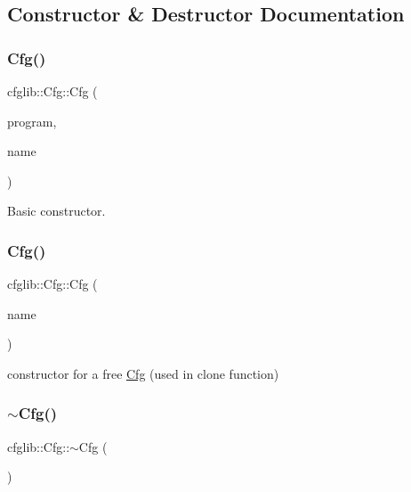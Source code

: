 \subsection{Constructor \& Destructor Documentation}
\mbox{\label{classcfglib_1_1Cfg_a0100bef586e13e2ad53c83b20e365c5e}} 
\subsubsection{\texorpdfstring{Cfg()}{Cfg()}\hspace{0.1cm}{\footnotesize\ttfamily [1/2]}}
{\footnotesize\ttfamily cfglib\+::\+Cfg\+::\+Cfg (\begin{DoxyParamCaption}\item[{\hyperlink{classcfglib_1_1Program}{Program} $\ast$}]{program,  }\item[{List\+Of\+String}]{name }\end{DoxyParamCaption})}

Basic constructor. \mbox{\label{classcfglib_1_1Cfg_a3c7102871bcac1c06389aa38674c76b1}} 
\subsubsection{\texorpdfstring{Cfg()}{Cfg()}\hspace{0.1cm}{\footnotesize\ttfamily [2/2]}}
{\footnotesize\ttfamily cfglib\+::\+Cfg\+::\+Cfg (\begin{DoxyParamCaption}\item[{List\+Of\+String}]{name }\end{DoxyParamCaption})}

constructor for a free \hyperlink{classcfglib_1_1Cfg}{Cfg} (used in clone function) \mbox{\label{classcfglib_1_1Cfg_a279b0b9b7f73a621bc50b35cf7fb7dda}} 
\subsubsection{\texorpdfstring{$\sim$\+Cfg()}{~Cfg()}}
{\footnotesize\ttfamily cfglib\+::\+Cfg\+::$\sim$\+Cfg (\begin{DoxyParamCaption}{ }\end{DoxyParamCaption})}

